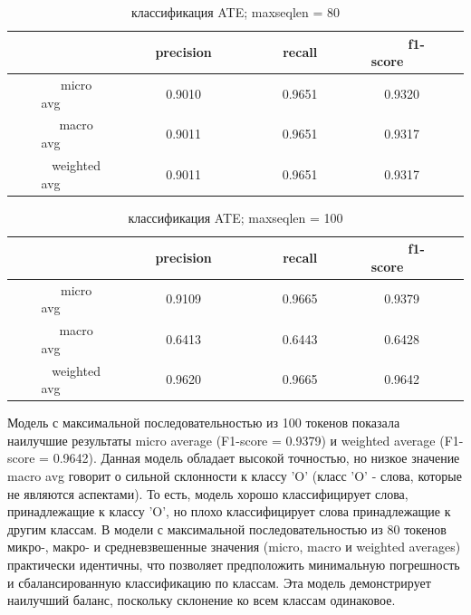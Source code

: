 \begin{center}
\begin{table}[h!]
\centering
\caption{классификация ATE; max\textunderscore seq\textunderscore len = 80}
\label{tabl:3}
\begin{tabular}{|c|c|c|c|c|}
\hline
~~~~~~~~&~~~~precision~~~~&~~~~recall~~~~&~~~~f1-score~~~~\\
\hline
~~~~micro avg~~~~&	0.9010  &	0.9651 & 0.9320\\
\hline
~~~~macro avg~~~~& 0.9011  &	0.9651 & 0.9317\\
\hline
~~~~weighted avg~~~~&	0.9011  &	0.9651	& 0.9317\\
\hline
\end{tabular}
\end{table}
\end{center}

\begin{center}
\begin{table}[h!]
\centering
\caption{классификация ATE; max\textunderscore seq\textunderscore len = 100}
\label{tabl:4}
\begin{tabular}{|c|c|c|c|c|}
\hline
~~~~~~~~&~~~~precision~~~~&~~~~recall~~~~&~~~~f1-score~~~~\\
\hline
~~~~micro avg~~~~&	0.9109  &	0.9665 & 0.9379\\
\hline
~~~~macro avg~~~~& 0.6413  &	0.6443 & 0.6428\\
\hline
~~~~weighted avg~~~~&	0.9620  &	0.9665	& 0.9642\\
\hline
\end{tabular}
\end{table}
\end{center}

 
Модель с максимальной последовательностью из 100 токенов показала наилучшие результаты micro average (F1-score = 0.9379) и weighted average (F1-score = 0.9642). Данная модель обладает высокой точностью, но низкое значение macro avg говорит о сильной склонности к классу 'O' (класс 'O' - слова, которые не являются аспектами). То есть, модель хорошо классифицирует слова, принадлежащие к классу 'O', но плохо классифицирует слова принадлежащие к другим классам. В модели с максимальной последовательностью из 80 токенов микро-, макро- и средневзвешенные значения (micro, macro и weighted averages) практически идентичны, что позволяет предположить минимальную погрешность и сбалансированную классификацию по классам. Эта модель демонстрирует наилучший баланс, поскольку склонение ко всем классам одинаковое.

